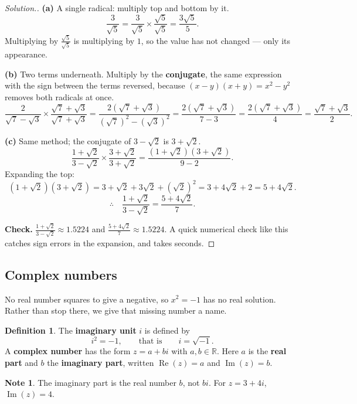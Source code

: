 \documentclass[11pt,a4paper]{article}
\theoremstyle{definition}
\newtheorem{definition}[thm]{Definition}
\newtheorem{note}[thm]{Note}
\newenvironment{solution}
  {\renewcommand{\qedsymbol}{}\begin{proof}[\textit{Solution}.]}
  {\end{proof}}
\begin{document}
\begin{solution}
\textbf{(a)} A single radical: multiply top and bottom by it.
$$\frac{3}{\sqrt{5}}=\frac{3}{\sqrt{5}}\times\frac{\sqrt{5}}{\sqrt{5}}
=\frac{3\sqrt{5}}{5}.$$
Multiplying by $\frac{\sqrt5}{\sqrt5}$ is multiplying by $1$, so the value has not
changed --- only its appearance.

\textbf{(b)} Two terms underneath. Multiply by the \textbf{conjugate}, the same
expression with the sign between the terms reversed, because
$(x-y)(x+y)=x^2-y^2$ removes both radicals at once.
$$\frac{2}{\sqrt{7}-\sqrt{3}}\times\frac{\sqrt{7}+\sqrt{3}}{\sqrt{7}+\sqrt{3}}
=\frac{2\left(\sqrt{7}+\sqrt{3}\right)}{\left(\sqrt{7}\right)^2-\left(\sqrt{3}\right)^2}
=\frac{2\left(\sqrt{7}+\sqrt{3}\right)}{7-3}
=\frac{2\left(\sqrt{7}+\sqrt{3}\right)}{4}
=\frac{\sqrt{7}+\sqrt{3}}{2}.$$

\textbf{(c)} Same method; the conjugate of $3-\sqrt{2}$ is $3+\sqrt{2}$.
$$\frac{1+\sqrt{2}}{3-\sqrt{2}}\times\frac{3+\sqrt{2}}{3+\sqrt{2}}
=\frac{\left(1+\sqrt{2}\right)\left(3+\sqrt{2}\right)}{9-2}.$$
Expanding the top:
$$\left(1+\sqrt{2}\right)\left(3+\sqrt{2}\right)
=3+\sqrt{2}+3\sqrt{2}+\left(\sqrt{2}\right)^2
=3+4\sqrt{2}+2=5+4\sqrt{2}.$$
$$\therefore\quad \frac{1+\sqrt{2}}{3-\sqrt{2}}=\frac{5+4\sqrt{2}}{7}.$$

\textbf{Check.} $\frac{1+\sqrt2}{3-\sqrt2}\approx 1.5224$ and
$\frac{5+4\sqrt2}{7}\approx 1.5224$. A quick numerical check like this catches sign
errors in the expansion, and takes seconds.
\end{solution}

\subsection{Complex numbers}

No real number squares to give a negative, so $x^2=-1$ has no real solution. Rather
than stop there, we give that missing number a name.

\begin{definition}
The \textbf{imaginary unit} $i$ is defined by
$$i^2=-1,\qquad\text{that is}\qquad i=\sqrt{-1}.$$
A \textbf{complex number} has the form $z=a+bi$ with $a,b\in\mathbb{R}$. Here $a$ is
the \textbf{real part} and $b$ the \textbf{imaginary part}, written
$\operatorname{Re}(z)=a$ and $\operatorname{Im}(z)=b$.
\end{definition}

\begin{note}
The imaginary part is the real number $b$, not $bi$. For $z=3+4i$,
$\operatorname{Im}(z)=4$.
\end{note}
\end{document}
